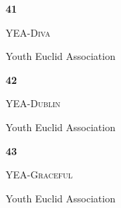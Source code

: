 \documentclass[extrafontsizes,30pt]{memoir}
\begin{document}
\newpage



\renewcommand{\TeamID}{41}
\renewcommand{\TeamName}{YEA-Diva}
\renewcommand{\SchoolName}{Youth Euclid Association}

\begin{center}
\mbox{}
\vspace{1in}

{\Huge \textbf{ \TeamID}}

\vspace{1in}

{\Large \textsc{\TeamName}}

\vspace{1in}

{\large \SchoolName}
\end{center}

\newpage



\renewcommand{\TeamID}{42}
\renewcommand{\TeamName}{YEA-Dublin}
\renewcommand{\SchoolName}{Youth Euclid Association}

\begin{center}
\mbox{}
\vspace{1in}

{\Huge \textbf{ \TeamID}}

\vspace{1in}

{\Large \textsc{\TeamName}}

\vspace{1in}

{\large \SchoolName}
\end{center}

\newpage



\renewcommand{\TeamID}{43}
\renewcommand{\TeamName}{YEA-Graceful}
\renewcommand{\SchoolName}{Youth Euclid Association}

\begin{center}
\mbox{}
\vspace{1in}

{\Huge \textbf{ \TeamID}}

\vspace{1in}

{\Large \textsc{\TeamName}}

\vspace{1in}

{\large \SchoolName}
\end{center}

\newpage
\end{document}
